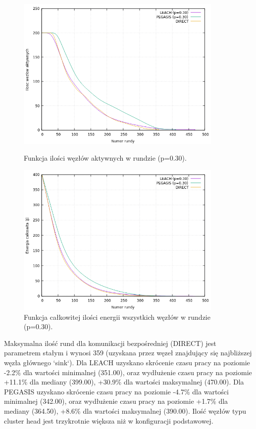 \documentclass[a4paper,12pt,twoside,openany]{report}
\begin{document}
\begin{figure}[H]
 \centering
 \includegraphics[width=10cm]{images/gnuplot/test_4/nodes_in_round_p030.png}
 \caption{Funkcja ilości węzłów aktywnych w rundzie (p=0.30).}
 \includegraphics[width=10cm]{images/gnuplot/test_4/energy_in_round_p030.png}
 \caption{Funkcja całkowitej ilości energii wszystkich węzłów w rundzie (p=0.30).}
\end{figure}

\par
Maksymalna ilość rund dla komunikacji bezpośredniej (DIRECT) jest parametrem stałym i wynosi 359 (uzyskana przez węzeł znajdujący się najbliższej węzła głównego `sink`).
Dla LEACH uzyskano skrócenie czasu pracy na poziomie -2.2\% dla wartości minimalnej (351.00), oraz wydłużenie czasu pracy na poziomie +11.1\% dla mediany (399.00), +30.9\% dla wartości maksymalnej (470.00).
Dla PEGASIS uzyskano skrócenie czasu pracy na poziomie -4.7\% dla wartości minimalnej (342.00), oraz wydłużenie czasu pracy na poziomie +1.7\% dla mediany (364.50), +8.6\% dla wartości maksymalnej (390.00).
Ilość węzłów typu cluster head jest trzykrotnie większa niż w konfiguracji podstawowej.
\end{document}
